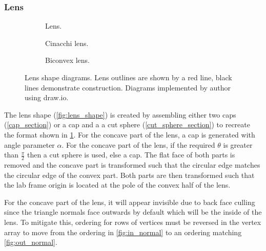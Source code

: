 \subsubsection{Lens}
\begin{figure}
  \begin{center}
    \begin{subfigure}{0.3\textwidth}
      
      \caption{Lens.}
      \label{fig:lens_diagram}
    \end{subfigure}
    \begin{subfigure}{0.3\textwidth}
      
      \caption{Cinacchi lens.}
      \label{fig:cinacchi_lens_diagram}
    \end{subfigure}
    \begin{subfigure}{0.3\textwidth}
      
      \caption{Biconvex lens.}
      \label{fig:biconvex_lens_diagram}
    \end{subfigure}
  \end{center}
  \caption{Lens shape diagrams. Lens outlines are shown by a red line, black lines demonstrate construction. Diagrams implemented by author using draw.io\cite{drawio}.}
  \label{fig:lens_descriptions}
\end{figure}

The lens shape (\cref{fig:lens_shape}) is created by assembling either two caps (\cref{cap_section}) or a cap and a a cut sphere (\cref{cut_sphere_section}) to recreate the format shown in \cref{fig:lens_diagram}. For the concave part of the lens, a cap is generated with angle parameter $\alpha$. For the concave part of the lens, if the required $\theta$ is greater than $\frac{\pi}{2}$ then a cut sphere is used, else a cap. The flat face of both parts is removed and the concave part is transformed such that the circular edge matches the circular edge of the convex part. Both parts are then transformed such that the lab frame origin is located at the pole of the convex half of the lens.

For the concave part of the lens, it will appear invisible due to back face culling since the triangle normals face outwards by default which will be the inside of the lens. To mitigate this, ordering for rows of vertices must be reversed in the vertex array to move from the ordering in \cref{fig:in_normal} to an ordering matching \cref{fig:out_normal}.

